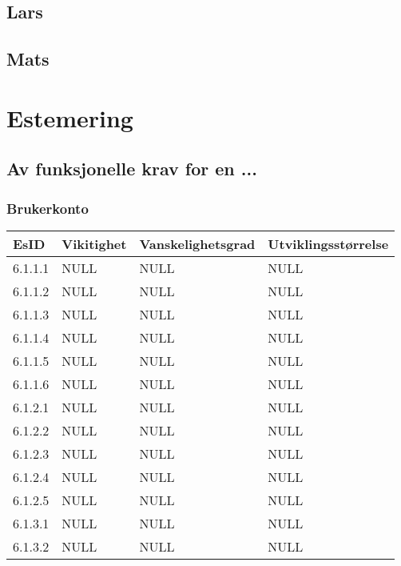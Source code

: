 \documentclass[12pt]{article}
\begin{document}
    \subsection{Lars}

    \subsection{Mats}

\section{Estemering}

    \subsection{Av funksjonelle krav for en ...}

        \subsubsection{Brukerkonto}
        \begin{tabular}{|p{2cm}|p{4cm}|p{4cm}|p{4cm}| } 
            \hline
            \bf EsID & \bf Vikitighet & \bf Vanskelighetsgrad & \bf Utviklingsstørrelse\\
            \hline
            6.1.1.1 & NULL & NULL & NULL\\
            \hline
            6.1.1.2 & NULL & NULL & NULL\\
            \hline
            6.1.1.3 & NULL & NULL & NULL\\
            \hline
            6.1.1.4 & NULL & NULL & NULL\\
            \hline
            6.1.1.5 & NULL & NULL & NULL\\
            \hline
            6.1.1.6 & NULL & NULL & NULL\\
            \hline
            6.1.2.1 & NULL & NULL & NULL\\
            \hline
            6.1.2.2 & NULL & NULL & NULL\\
            \hline
            6.1.2.3 & NULL & NULL & NULL\\
            \hline
            6.1.2.4 & NULL & NULL & NULL\\
            \hline
            6.1.2.5 & NULL & NULL & NULL\\
            \hline
            6.1.3.1 & NULL & NULL & NULL\\
            \hline
            6.1.3.2 & NULL & NULL & NULL\\
            \hline
        \end{tabular}
    
\end{document}
